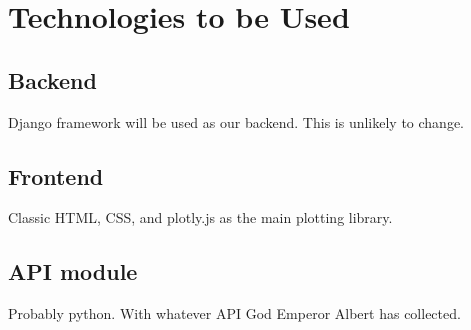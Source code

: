 \documentclass[a4paper,11pt]{article}
\begin{document}
\section*{Technologies to be Used}
\subsection*{Backend}
	Django framework will be used as our backend. This is unlikely to change.
\subsection*{Frontend}
Classic HTML, CSS, and plotly.js as the main plotting library.

\subsection*{API module}
Probably python. With whatever API God Emperor Albert has collected.
\end{document}
